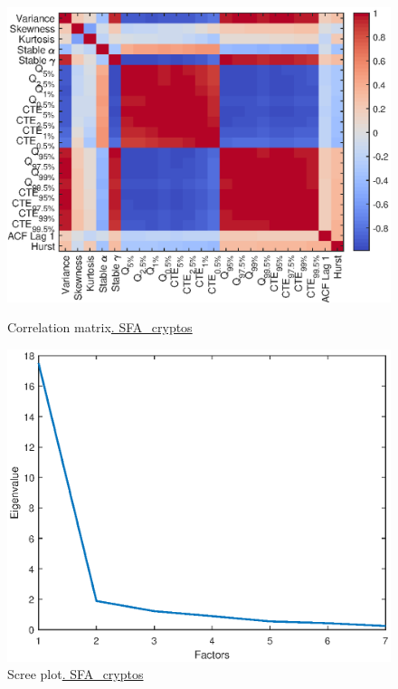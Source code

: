\begin{figure}[H]
  \begin{minipage}[b]{0.52\textwidth}
\centering
\includegraphics[width=1\textwidth]{Fig/figure_2}
      \caption{Correlation matrix\href{https://github.com/QuantLet/Genus_proximum_cryptos/tree/master/SFA_Cryptos}{. SFA\_cryptos}}
      \label{fig:figure_2}
  \end{minipage}
  \begin{minipage}[b]{0.53\textwidth}
\centering
\includegraphics[width=1\textwidth]{Fig/figure_3}
  \caption{Scree plot\href{https://github.com/QuantLet/Genus_proximum_cryptos/tree/master/SFA_Cryptos}{. SFA\_cryptos}}
    \label{fig:figure_3}
  \end{minipage}
\end{figure}


